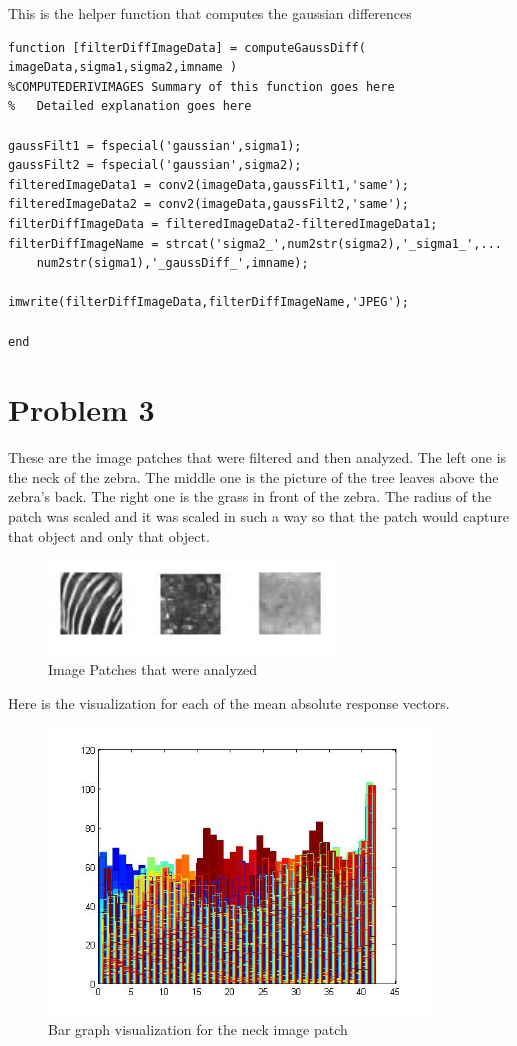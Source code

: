 \documentclass[11pt,psfig]{article}
\begin{document}
This is the helper function that computes the gaussian differences

\begin{verbatim}
function [filterDiffImageData] = computeGaussDiff( imageData,sigma1,sigma2,imname )
%COMPUTEDERIVIMAGES Summary of this function goes here
%   Detailed explanation goes here

gaussFilt1 = fspecial('gaussian',sigma1);
gaussFilt2 = fspecial('gaussian',sigma2);
filteredImageData1 = conv2(imageData,gaussFilt1,'same');
filteredImageData2 = conv2(imageData,gaussFilt2,'same');
filterDiffImageData = filteredImageData2-filteredImageData1;
filterDiffImageName = strcat('sigma2_',num2str(sigma2),'_sigma1_',...
    num2str(sigma1),'_gaussDiff_',imname);

imwrite(filterDiffImageData,filterDiffImageName,'JPEG');

end
\end{verbatim}

\newpage

\section*{Problem 3}

These are the image patches that were filtered and then analyzed. The left one is the neck of the zebra. The middle one is the picture of the tree leaves above the zebra's back. The right one is the grass in front of the zebra. The radius of the patch was scaled and it was scaled in such a way so that the patch would capture that object and only that object. 

\begin{figure}[H]
\centering
\includegraphics[width=3in]{prob3patches.jpg}
\caption{Image Patches that were analyzed}
\end{figure}

Here is the visualization for each of the mean absolute response vectors. 

\begin{figure}[H]
\centering
\includegraphics[height=3in]{prob3patch1bar.jpg}
\caption{Bar graph visualization for the neck image patch}
\end{figure}
\end{document}
